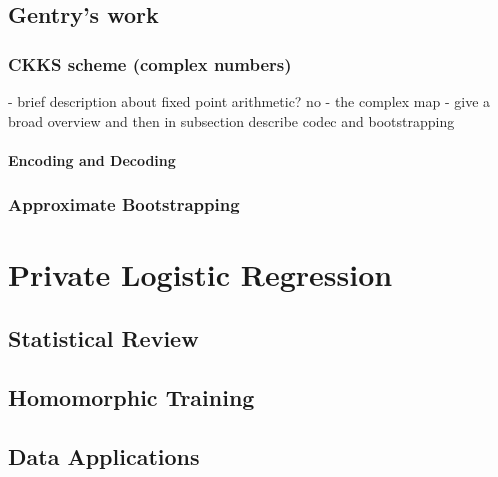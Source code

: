 \section{Gentry's work}




\subsection{CKKS scheme (complex numbers)}

- brief description about fixed point arithmetic? no 
- the complex map 
- give a broad overview and then in subsection describe codec and bootstrapping

\subsubsection{Encoding and Decoding}


\subsection{Approximate Bootstrapping}

\chapter{Private Logistic Regression}
\section{Statistical Review}
\section{Homomorphic Training}
\section{Data Applications}


\label{ch:algebra}

